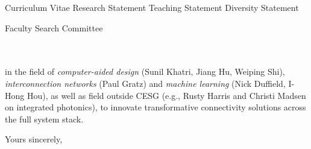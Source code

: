 



\addAttach%
{Curriculum Vitae}%
{Research Statement}%
{Teaching Statement}%
{Diversity Statement}
\def\appSpecific{with significant implications for the research field related to Computer Engineering \& Systems Group (CESG)}
\def\letterCustom{%
    in the field of \emph{computer-aided design} (Sunil Khatri, Jiang Hu, Weiping Shi), \emph{interconnection networks} (Paul Gratz) and \emph{machine learning} (Nick Duffield, I-Hong Hou), as well as field outside CESG (e.g., Rusty Harris and Christi Madsen on integrated photonics), to innovate transformative connectivity solutions across the full system stack.%
}

\def\appJobID{%
    \ifthenelse{\equal{\jobID}{}}{\unskip}{\unskip\textemdash Job \# \jobID{}}%
}
\def\toAddr{%
Faculty Search Committee \\ \appDept{} \\ \appSchool{} \\ \appAddr{}%
}

\begin{letter}{\toAddr{}}
    \opening{\myOpening{}}
    
    \letterCustom{}
    
    \closing{Yours sincerely,}
    \encl{\listAttach{}}
\end{letter}
